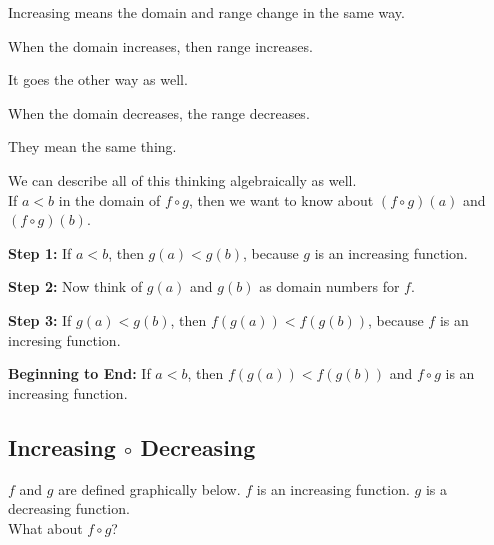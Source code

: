 \documentclass{ximera}
\begin{document}
\begin{warning}

Increasing means the domain and range change in the same way.

When the domain increases, then range increases.

It goes the other way as well.

When the domain decreases, the range decreases.

They mean the same thing.


\end{warning}



We can describe all of this thinking algebraically as well. \\


If $a < b$ in the domain of $f \circ g$, then we want to know about $(f \circ g)(a)$  and $(f \circ g)(b)$.



\textbf{Step 1:}  If $a < b$, then $g(a) < g(b)$, because $g$ is an increasing function.


\textbf{Step 2:}  Now think of $g(a)$  and $g(b)$ as domain numbers for $f$.


\textbf{Step 3:}  If $g(a) < g(b)$, then $f(g(a)) < f(g(b))$, because $f$ is an incresing function.


\textbf{Beginning to End:} If $a < b$, then $f(g(a)) < f(g(b))$ and $f \circ g$ is an increasing function.




















\subsection*{Increasing $\circ$ Decreasing}



$f$ and $g$ are defined graphically below.  $f$ is an increasing function.  $g$ is a decreasing function. \\

What about $f \circ g$? \\
\end{document}
